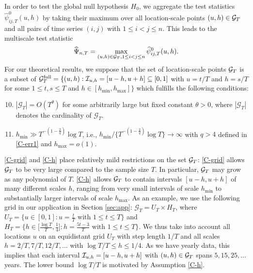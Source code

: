 \documentclass[12pt]{article}
\begin{document}
In order to test the global null hypothesis $H_0$, we aggregate the test statistics $\widehat{\psi}^0_{ij, T}(u, h)$ by taking their maximum over all location-scale points $(u,h) \in \mathcal{G}_T$ and all pairs of time series $(i,j)$ with $1 \le i < j \le n$. This leads to the multiscale test statistic 
\[ \widehat{\Psi}_{n,T} = \max_{(u,h) \in \mathcal{G}_T, 1 \le i < j \le n} \widehat{\psi}^0_{ij, T}(u, h). \]
For our theoretical results, we suppose that the set of location-scale points $\mathcal{G}_T$ is a subset of $\mathcal{G}_T^{\text{full}} = \{ (u, h): \mathcal{I}_{u, h} = [u-h,u+h] \subseteq [0,1]$ with $u = t/T$ and $h = s/T$  for some $1 \le t, s \le T$ and $h \in [h_{\min},h_{\max}] \}$ which fulfills the following conditions:
\begin{enumerate}[label=(C\arabic*),leftmargin=1.2cm, itemsep=0pt, parsep=0pt, topsep=3pt]
\setcounter{enumi}{9}

\item \label{C-grid} $|\mathcal{G}_T| = O(T^\theta)$ for some arbitrarily large but fixed constant $\theta > 0$, where $|\mathcal{G}_T|$ denotes the cardinality of $\mathcal{G}_T$. 

\item \label{C-h} $h_{\min} \gg T^{-(1-\frac{2}{q})} \log T$, i.e., $h_{\min} / \{ T^{-(1-\frac{2}{q})} \log T \} \rightarrow \infty$ with $q > 4$ defined in \ref{C-err1} and $h_{\max} = o(1)$.

\end{enumerate}
\ref{C-grid} and \ref{C-h} place relatively mild restrictions on the set $\mathcal{G}_T$: \ref{C-grid} allows $\mathcal{G}_T$ to be very large compared to the sample size $T$. In particular, $\mathcal{G}_T$ may grow as any polynomial of $T$. \ref{C-h} allows $\mathcal{G}_T$ to contain intervals $[u-h,u+h]$ of many different scales $h$, ranging from very small intervals of scale $h_{\min}$ to substantially larger intervals of scale $h_{\max}$.
As an example, we use the following grid in our application in Section \ref{sec:app}: $\mathcal{G}_T = U_T \times H_T$, where $U_T = \big\{ u \in [0,1]: u = \textstyle{\frac{t}{T}} \text{ with } 1 \le t \le T \big\}$ and $H_T = \big\{ h \in \big[ \textstyle{\frac{\log T}{T}}, \textstyle{\frac{1}{4}} \big]:  h = \textstyle{\frac{5t - 3}{T}} \text{ with } 1 \le t \le T \big\}$. We thus take into account all locations $u$ on an equidistant grid $U_T$ with step length $1/T$ and all scales $h=2/T, 7/T, 12/T,\ldots$ with $\log T /T \le h \le 1/4$. As we have yearly data, this implies that each interval $\mathcal{I}_{u, h} =[u-h,u+h]$ with $(u,h) \in \mathcal{G}_T$ spans $5, 15, 25, \ldots$ years. The lower bound $\log T / T$ is motivated by Assumption \ref{C-h}. 
\end{document}
